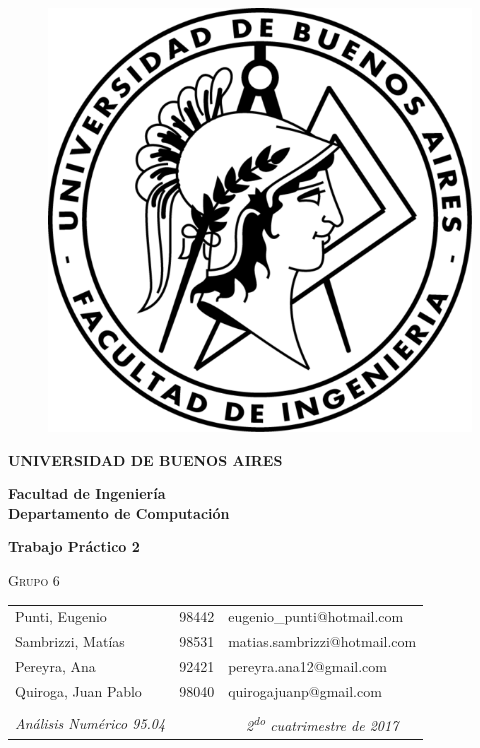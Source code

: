 \begin{figure}[h]
\centering
\includegraphics[scale=.6]{caratula.png}
\end{figure}

\begin{center}

\bigskip
\textbf{UNIVERSIDAD DE BUENOS AIRES}

\smallskip

\textbf{Facultad de Ingeniería}
\\
\textbf{Departamento de Computación}


\end{center}

\vspace{1cm}
\begin{center}
{{\Huge\textbf{Trabajo Práctico 2}}}
\end{center}

\vspace{0.40cm}
\centerline{\Large{{\textsc{Grupo 6}}}}

\begin{table}[H]
\centering
\begin{tabular}{lll}
\hline\hline
Punti, Eugenio       & 98442 & eugenio\_punti@hotmail.com   \\
Sambrizzi, Matías    & 98531 & matias.sambrizzi@hotmail.com     \\
Pereyra, Ana    & 92421 & pereyra.ana12@gmail.com     \\
Quiroga, Juan Pablo & 98040 & quirogajuanp@gmail.com      \\
\hline\hline
                             &       &                                                                              \\
\multicolumn{1}{c}{\textsl{ Análisis Numérico 95.04}} &  & \multicolumn{1}{c}{\textsl{ 2\textsuperscript{do} cuatrimestre de 2017}}
\end{tabular}
\end{table}  
